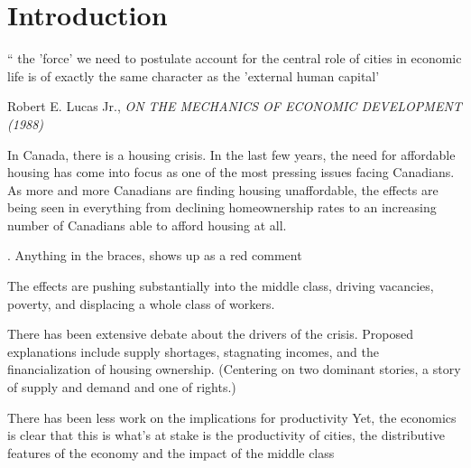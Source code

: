 \chapter{Introduction}

\epigraph{`` the 'force' we need to postulate account for the central role of cities in economic life is of exactly the same character as the 'external human capital'}{Robert E. Lucas Jr., \textit{ON THE MECHANICS OF ECONOMIC DEVELOPMENT (1988)}}


 

In Canada, there is a housing crisis. In the last few years, the need for affordable housing has come into focus as one of the most pressing issues facing Canadians. %
As more and more Canadians are finding housing unaffordable, the effects are being seen in everything from declining homeownership rates to an increasing number of Canadians able to afford housing at all.

{\color{red}. Anything in the braces, shows up as a red comment}

The effects are pushing substantially into the middle class, driving vacancies, poverty, and displacing a whole class of workers. %

There has been extensive debate about the drivers of the crisis.  Proposed explanations include supply shortages, stagnating incomes, and the financialization of housing ownership.
(Centering on two dominant stories, a story of supply and demand and one of rights.) %

There has been less work on the implications for productivity %
Yet, the economics is clear that %
this is what's at stake is the productivity of cities, the distributive features of the economy and the impact of the middle class %

